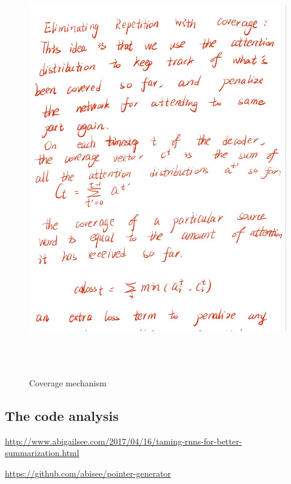 \documentclass[UTF8]{ctexart}
\begin{document}
    \begin{figure}[htbp]
        \centering
        \vspace{-0.35cm} 
        \includegraphics[width=14cm,height=18cm]{pictures/33.jpg}
        \caption{Coverage mechanism}
    \end{figure}



  
    \subsection{The code analysis}

    \url{http://www.abigailsee.com/2017/04/16/taming-rnns-for-better-summarization.html}

    \url{https://github.com/abisee/pointer-generator}



    
\end{document}
